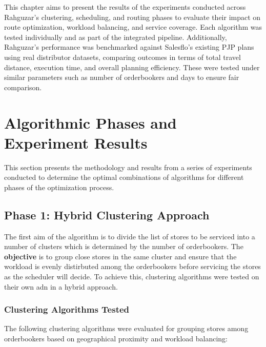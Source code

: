 This chapter aims to present the results of the experiments conducted across Rahguzar’s clustering, scheduling, and routing phases to evaluate their impact on route optimization, workload balancing, and service coverage. Each algorithm was tested individually and as part of the integrated pipeline. Additionally, Rahguzar’s performance was benchmarked against Salesflo's existing PJP plans using real distributor datasets, comparing outcomes in terms of total travel distance, execution time, and overall planning efficiency. These were tested under similar parameters such as number of orderbookers and days to ensure fair comparison.

\section{Algorithmic Phases and Experiment Results}

This section presents the methodology and results from a series of experiments conducted to determine the optimal combinations of algorithms for different phases of the optimization process.




\subsection{Phase 1: Hybrid Clustering Approach}
The first aim of the algorithm is to divide the list of stores to be serviced into a number of clusters which is determined by the number of orderbookers.
The \textbf{objective} is to group close stores in the same cluster and ensure that the workload is evenly distirbuted among the orderbookers before servicing the stores as the scheduler will decide.
To achieve this, clustering algorithms were tested on their own adn in a hybrid approach.

\subsubsection{Clustering Algorithms Tested}

The following clustering algorithms were evaluated for grouping stores among orderbookers based on geographical proximity and workload balancing:

